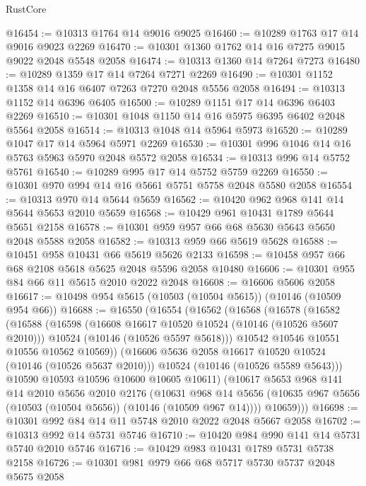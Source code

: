 \begin{lexlean}{RustCore}
\begin{coremodule}
@16454 := @10313 @1764 @14 @9016 @9025
@16460 := @10289 @1763 @17 @14 @9016 @9023 @2269
@16470 := @10301 @1360 @1762 @14 @16 @7275 @9015 @9022 @2048 @5548 @2058
@16474 := @10313 @1360 @14 @7264 @7273
@16480 := @10289 @1359 @17 @14 @7264 @7271 @2269
@16490 := @10301 @1152 @1358 @14 @16 @6407 @7263 @7270 @2048 @5556 @2058
@16494 := @10313 @1152 @14 @6396 @6405
@16500 := @10289 @1151 @17 @14 @6396 @6403 @2269
@16510 := @10301 @1048 @1150 @14 @16 @5975 @6395 @6402 @2048 @5564 @2058
@16514 := @10313 @1048 @14 @5964 @5973
@16520 := @10289 @1047 @17 @14 @5964 @5971 @2269
@16530 := @10301 @996 @1046 @14 @16 @5763 @5963 @5970 @2048 @5572 @2058
@16534 := @10313 @996 @14 @5752 @5761
@16540 := @10289 @995 @17 @14 @5752 @5759 @2269
@16550 := @10301 @970 @994 @14 @16 @5661 @5751 @5758 @2048 @5580 @2058
@16554 := @10313 @970 @14 @5644 @5659
@16562 := @10420 @962 @968 @141 @14 @5644 @5653 @2010 @5659
@16568 := @10429 @961 @10431 @1789 @5644 @5651 @2158
@16578 := @10301 @959 @957 @66 @68 @5630 @5643 @5650 @2048 @5588 @2058
@16582 := @10313 @959 @66 @5619 @5628
@16588 := @10451 @958 @10431 @66 @5619 @5626 @2133
@16598 := @10458 @957 @66 @68 @2108 @5618 @5625 @2048 @5596 @2058 @10480
@16606 := @10301 @955 @84 @66 @11 @5615 @2010 @2022 @2048
@16608 := @16606 @5606 @2058
@16617 := @10498 @954 @5615 (@10503 (@10504 @5615)) (@10146 (@10509 @954 @66))
@16688 := @16550
    (@16554
      (@16562
        (@16568
          (@16578
            (@16582
              (@16588
                (@16598
                  (@16608 @16617 @10520 @10524 (@10146 (@10526 @5607 @2010)))
                  @10524
                  (@10146 (@10526 @5597 @5618)))
                @10542
                @10546
                @10551
                @10556
                @10562
                @10569))
            (@16606 @5636 @2058 @16617 @10520 @10524 (@10146 (@10526 @5637 @2010)))
            @10524
            (@10146 (@10526 @5589 @5643)))
          @10590
          @10593
          @10596
          @10600
          @10605
          @10611)
        (@10617
          @5653
          @968
          @141
          @14
          @2010
          @5656
          @2010
          @2176
          (@10631
            @968
            @14
            @5656
            (@10635 @967 @5656 (@10503 (@10504 @5656)) (@10146 (@10509 @967 @14))))
          @10659)))
@16698 := @10301 @992 @84 @14 @11 @5748 @2010 @2022 @2048 @5667 @2058
@16702 := @10313 @992 @14 @5731 @5746
@16710 := @10420 @984 @990 @141 @14 @5731 @5740 @2010 @5746
@16716 := @10429 @983 @10431 @1789 @5731 @5738 @2158
@16726 := @10301 @981 @979 @66 @68 @5717 @5730 @5737 @2048 @5675 @2058

\end{coremodule}
\end{lexlean}
